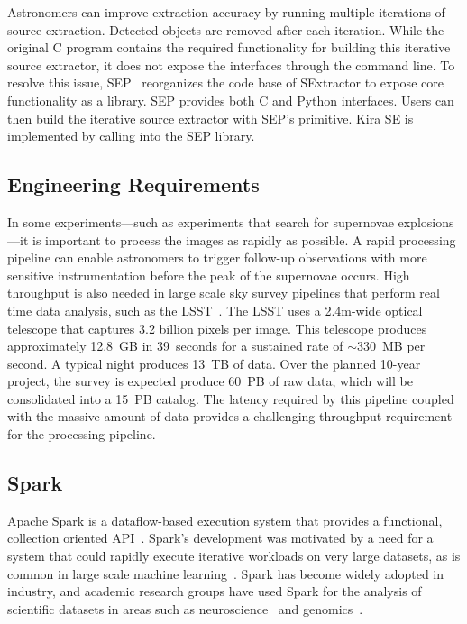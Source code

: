 \documentclass[10pt,journal,compsoc]{IEEEtran}
\begin{document}
Astronomers can improve extraction accuracy by running multiple iterations of source
extraction. Detected objects are removed after each iteration. While
the original C program contains the required functionality for building this iterative source extractor,
it does not expose the interfaces through the command line. To resolve this issue,
SEP~\cite{barbary2015} reorganizes the code base of SExtractor to expose core
functionality as a library. SEP provides both C and Python interfaces. Users can then
build the iterative source extractor with SEP's primitive. Kira SE is implemented by calling into
the SEP library.

\subsection{Engineering Requirements}
\label{sec:Background-EngReq}

In some experiments---such as experiments that search for supernovae explosions---it is important to process
the images as rapidly as possible. A rapid processing pipeline can enable astronomers to trigger follow-up
observations with more sensitive instrumentation before the peak of the supernovae occurs.
High throughput is also needed in large scale
sky survey pipelines that perform real time data analysis, such as the LSST~\cite{ivezic08}.
The LSST uses a 2.4m-wide optical telescope that captures 3.2 billion pixels per
image. This telescope produces approximately 12.8~GB in 39~seconds
for a sustained rate of $\sim$330~MB per second. A typical night produces 13~TB of data. 
Over the planned 10-year project, the survey is expected produce 60~PB of raw data, which will be consolidated into a 15~PB catalog.
The latency required by this pipeline coupled with the massive amount of data provides a challenging throughput requirement for the 
processing pipeline. 

\subsection{Spark}
Apache Spark is a dataflow-based execution system that provides a functional, collection
oriented API~\cite{zaharia12}. Spark's development was motivated by a need for a
system that could rapidly execute iterative workloads on very large datasets, as is common
in large scale machine learning~\cite{zaharia10}. Spark has
become widely adopted in industry, and academic research groups have used Spark
for the analysis of scientific datasets in areas such as neuroscience~\cite{freeman14} and genomics~\cite{nothaft15}.
\end{document}
